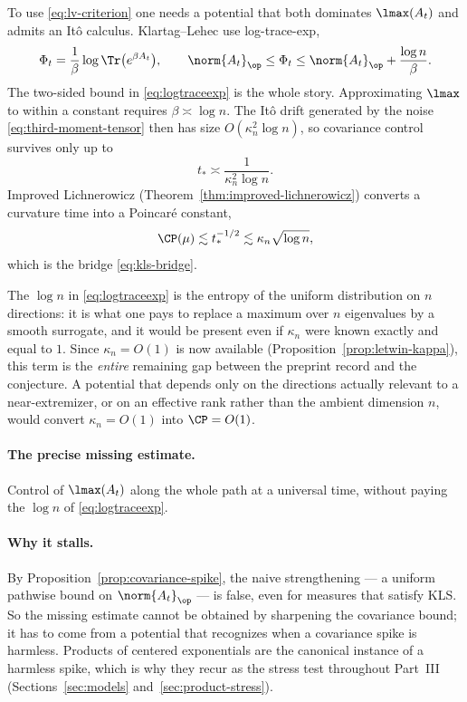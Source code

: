 \documentclass[../../main.tex]{subfiles}
\begin{document}
To use \eqref{eq:lv-criterion} one needs a potential that both dominates $\lmax(A_t)$ and admits
an It\^o calculus. Klartag--Lehec use log-trace-exp,
\begin{equation}
  \Phi_t=\frac1\beta\log\Tr\bigl(e^{\beta A_t}\bigr),
  \qquad
  \norm{A_t}_\op\le\Phi_t\le\norm{A_t}_\op+\frac{\log n}\beta .
  \label{eq:logtraceexp}
\end{equation}
The two-sided bound in \eqref{eq:logtraceexp} is the whole story. Approximating $\lmax$ to within
a constant requires $\beta\asymp\log n$. The It\^o drift generated by the noise
\eqref{eq:third-moment-tensor} then has size $O(\kappa_n^2\log n)$, so covariance control survives
only up to
\begin{equation}
  t_*\asymp\frac1{\kappa_n^2\log n} .
  \label{eq:tstar}
\end{equation}
Improved Lichnerowicz (Theorem~\ref{thm:improved-lichnerowicz}) converts a curvature time into a
Poincar\'e constant,
\[
  \CP(\mu)\lesssim t_*^{-1/2}\lesssim\kappa_n\sqrt{\log n},
\]
which is the bridge \eqref{eq:kls-bridge}.

\begin{remark}
\label{rem:log-is-entropy}
The $\log n$ in \eqref{eq:logtraceexp} is the entropy of the uniform distribution on $n$
directions: it is what one pays to replace a maximum over $n$ eigenvalues by a smooth surrogate,
and it would be present even if $\kappa_n$ were known exactly and equal to $1$. Since
$\kappa_n=O(1)$ is now available (Proposition~\ref{prop:letwin-kappa}), this term is the \emph{entire}
remaining gap between the preprint record and the conjecture. A potential that depends only on the
directions actually relevant to a near-extremizer, or on an effective rank rather than the ambient
dimension $n$, would convert $\kappa_n=O(1)$ into $\CP=O(1)$.
\end{remark}

\paragraph{The precise missing estimate.}
Control of $\lmax(A_t)$ along the whole path at a universal time, without paying the $\log n$
of \eqref{eq:logtraceexp}.

\paragraph{Why it stalls.}
By Proposition~\ref{prop:covariance-spike}, the naive strengthening --- a uniform pathwise bound
on $\norm{A_t}_\op$ --- is false, even for measures that satisfy KLS. So the missing estimate
cannot be obtained by sharpening the covariance bound; it has to come from a potential that
recognizes when a covariance spike is harmless. Products of centered exponentials are the
canonical instance of a harmless spike, which is why they recur as the stress test throughout
Part~III (Sections~\ref{sec:models} and~\ref{sec:product-stress}).
\end{document}
